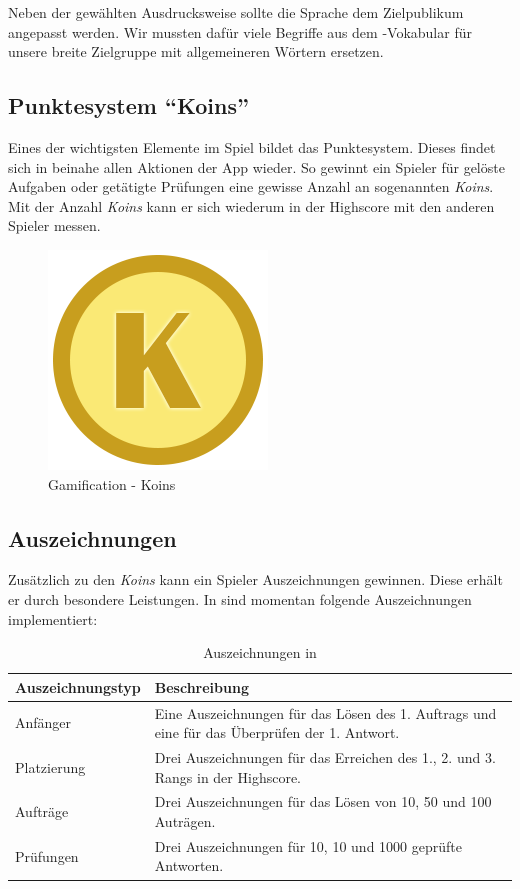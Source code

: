 Neben der gewählten Ausdrucksweise sollte die Sprache dem Zielpublikum angepasst werden.
Wir mussten dafür viele Begriffe aus dem -Vokabular für unsere breite Zielgruppe mit allgemeineren Wörtern ersetzen.

\subsection{Punktesystem "`Koins"'}
Eines der wichtigsten Elemente im Spiel bildet das Punktesystem. Dieses findet sich in beinahe allen Aktionen der App wieder.
So gewinnt ein Spieler für gelöste Aufgaben oder getätigte Prüfungen eine gewisse Anzahl an sogenannten \emph{Koins}.
Mit der Anzahl \emph{Koins} kann er sich wiederum in der Highscore mit den anderen Spieler messen.

\begin{figure}[H]
	\centering
	\includegraphics[scale=0.4]{images/gamification/gamification-koin}
	\caption{Gamification - Koins}
	\label{gamification-koins}
\end{figure}

\subsection{Auszeichnungen}
Zusätzlich zu den \emph{Koins} kann ein Spieler Auszeichnungen gewinnen. Diese erhält er durch besondere Leistungen. In \kort{} sind momentan folgende Auszeichnungen implementiert:

\begin{table}[H]
\centering
\begin{tabular}{|p{0.25\twocelltabwidth}|p{0.75\twocelltabwidth}|}
\hline 
\textbf{Auszeichnungstyp} & \textbf{Beschreibung} \\ 
\hline 
Anfänger & Eine Auszeichnungen für das Lösen des 1. Auftrags und eine für das Überprüfen der 1. Antwort. \\ 
\hline 
Platzierung & Drei Auszeichnungen für das Erreichen des 1., 2. und 3. Rangs in der Highscore. \\ 
\hline 
Aufträge & Drei Auszeichnungen für das Lösen von 10, 50 und 100 Auträgen. \\ 
\hline 
Prüfungen & Drei Auszeichnungen für 10, 10 und 1000 geprüfte Antworten. \\ 
\hline 
\end{tabular} 
\caption{Auszeichnungen in \kort{}}
\label{kort-badges}
\end{table}

